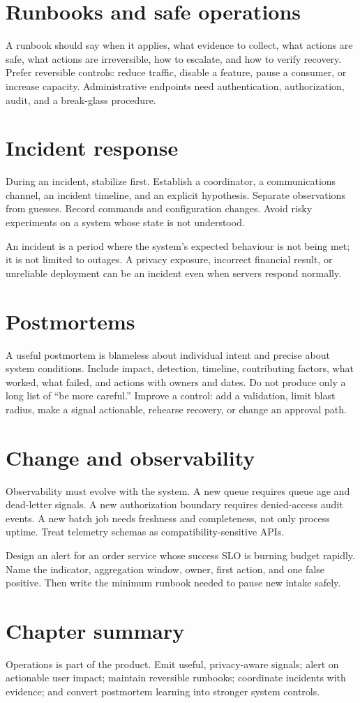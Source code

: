 \section{Runbooks and safe operations}
A runbook should say when it applies, what evidence to collect, what actions are
safe, what actions are irreversible, how to escalate, and how to verify recovery.
Prefer reversible controls: reduce traffic, disable a feature, pause a consumer,
or increase capacity. Administrative endpoints need authentication,
authorization, audit, and a break-glass procedure.

\section{Incident response}
During an incident, stabilize first. Establish a coordinator, a communications
channel, an incident timeline, and an explicit hypothesis. Separate observations
from guesses. Record commands and configuration changes. Avoid risky experiments
on a system whose state is not understood.

An incident is a period where the system's expected behaviour is not being met;
it is not limited to outages. A privacy exposure, incorrect financial result, or
unreliable deployment can be an incident even when servers respond normally.

\section{Postmortems}
A useful postmortem is blameless about individual intent and precise about system
conditions. Include impact, detection, timeline, contributing factors, what
worked, what failed, and actions with owners and dates. Do not produce only a
long list of “be more careful.” Improve a control: add a validation, limit blast
radius, make a signal actionable, rehearse recovery, or change an approval path.

\section{Change and observability}
Observability must evolve with the system. A new queue requires queue age and
dead-letter signals. A new authorization boundary requires denied-access audit
events. A new batch job needs freshness and completeness, not only process
uptime. Treat telemetry schemas as compatibility-sensitive APIs.

\begin{exercise}
Design an alert for an order service whose success SLO is burning budget rapidly.
Name the indicator, aggregation window, owner, first action, and one false
positive. Then write the minimum runbook needed to pause new intake safely.
\end{exercise}

\section{Chapter summary}
Operations is part of the product. Emit useful, privacy-aware signals; alert on
actionable user impact; maintain reversible runbooks; coordinate incidents with
evidence; and convert postmortem learning into stronger system controls.

